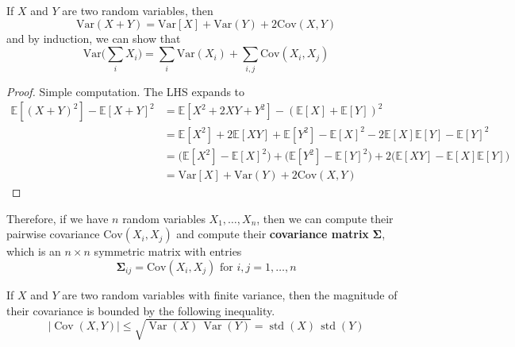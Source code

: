 \documentclass{article}
\DeclareMathOperator{\std}{std}
\DeclareMathOperator{\Cov}{Cov}
\DeclareMathOperator{\Var}{Var}
\begin{document}
    \begin{theorem}
      If $X$ and $Y$ are two random variables, then 
      \begin{equation}
        \mathrm{Var}(X + Y) = \mathrm{Var}[X] + \mathrm{Var}(Y) + 2 \mathrm{Cov}(X, Y)
      \end{equation}
      and by induction, we can show that 
      \begin{equation}
        \mathrm{Var}\bigg( \sum_i X_i\bigg) = \sum_{i} \mathrm{Var}(X_i) + \sum_{i, j} \mathrm{Cov}(X_i, X_j)
      \end{equation}
    \end{theorem}
    \begin{proof}
      Simple computation. The LHS expands to 
      \begin{align*}
        \mathbb{E}[(X + Y)^2] - \mathbb{E}[X + Y]^2 & = \mathbb{E}[X^2 + 2XY + Y^2] - (\mathbb{E}[X] + \mathbb{E}[Y])^2 \\
        & = \mathbb{E}[X^2] + 2 \mathbb{E}[XY] + \mathbb{E}[Y^2] - \mathbb{E}[X]^2 - 2 \mathbb{E}[X] \mathbb{E}[Y] - \mathbb{E}[Y]^2 \\
        & = \big( \mathbb{E}[X^2] - \mathbb{E}[X]^2 \big) + \big( \mathbb{E}[Y^2] - \mathbb{E}[Y]^2 \big) + 2 \big( \mathbb{E}[XY] - \mathbb{E}[X] \mathbb{E}[Y] \big) \\
        & = \mathrm{Var}[X] + \mathrm{Var}(Y) + 2 \mathrm{Cov}(X, Y) 
      \end{align*}
    \end{proof}

    Therefore, if we have $n$ random variables $X_1, \ldots, X_n$, then we can compute their pairwise covariance $\mathrm{Cov}(X_i, X_j)$ and compute their \textbf{covariance matrix} $\boldsymbol{\Sigma}$, which is an $n \times n$ symmetric matrix with entries 
    \begin{equation}
      \boldsymbol{\Sigma}_{ij} = \mathrm{Cov}(X_i, X_j) \text{ for } i, j = 1, \ldots, n
    \end{equation}

    \begin{theorem}
      If $X$ and $Y$ are two random variables with finite variance, then the magnitude of their covariance is bounded by the following inequality. 
      \begin{equation}
        |\Cov(X,Y)| \leq \sqrt{\Var(X) \, \Var(Y)} = \std(X) \, \std(Y)
      \end{equation}
    \end{theorem}
\end{document}

